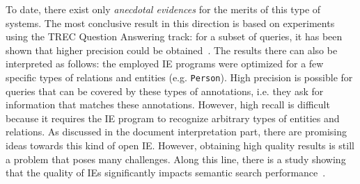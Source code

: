 To date, there exist only \emph{anecdotal evidences} for the merits of this type of systems. 
The most conclusive result in this direction is based on experiments using the TREC Question Answering track: for a subset of queries, it has been shown that higher precision could be obtained~\cite{DBLP:conf/sigir/Chu-CarrollPCFD06}. The results there can also be interpreted as follows: the employed IE programs were optimized for a few specific types of relations and entities (e.g. \verb+Person+). High precision is possible for queries that can be covered by these types of annotations, i.e. they ask for information that matches these annotations. However, high recall is difficult because it requires the IE program to recognize arbitrary types of entities and relations. As discussed in the document interpretation part, there are promising ideas towards this kind of open IE. However, obtaining high quality results is still a problem that poses many challenges. Along this line, there is a study showing that the quality of IEs significantly impacts semantic search performance~\cite{DBLP:conf/cikm/Chu-CarrollP07}. 

